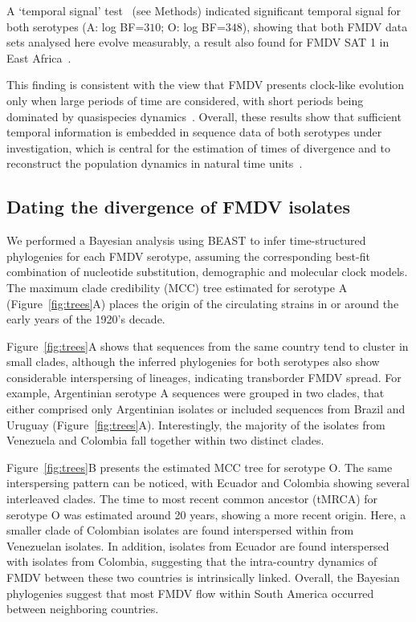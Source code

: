 \documentclass[10pt]{article}
\begin{document}
A  `temporal signal' test~\cite{Faria2012} (see Methods) indicated significant temporal signal for both serotypes (A: log BF=$310$; O: log BF=$348$), showing that both FMDV data sets analysed here evolve measurably, a result also found for FMDV SAT 1 in East Africa~\cite{sangula}.

This finding is consistent with the view that FMDV presents clock-like evolution only when large periods of time are considered, with short periods being dominated by quasispecies dynamics~\cite{Muellner2011}.
Overall, these results show that sufficient temporal information is embedded in sequence data of both serotypes under investigation, which is central for the estimation of times of divergence and to reconstruct the population dynamics in natural time units~\cite{MEP}.

\subsection*{Dating the divergence of FMDV isolates}

We performed a Bayesian analysis using BEAST to infer time-structured phylogenies for each FMDV serotype, assuming the corresponding best-fit combination of nucleotide substitution, demographic and molecular clock models.
The maximum clade credibility (MCC) tree estimated for serotype A (Figure~\ref{fig:trees}A) places the origin of the circulating strains in or around the early years of the 1920's decade.

Figure~\ref{fig:trees}A shows that sequences from the same country tend to cluster in small clades, although the inferred phylogenies for both serotypes also show considerable interspersing of lineages, indicating transborder FMDV spread.
For example, Argentinian serotype A sequences were grouped in two clades, that either comprised only Argentinian isolates or included sequences from Brazil and Uruguay (Figure~\ref{fig:trees}A).
Interestingly, the majority of the isolates from Venezuela and Colombia fall together within two distinct clades. 

Figure~\ref{fig:trees}B presents the estimated MCC tree for serotype O.
The same interspersing pattern can be noticed, with Ecuador and Colombia showing several interleaved clades.
The time to most recent common ancestor (tMRCA) for serotype O was estimated around 20 years, showing a more recent origin.
Here, a smaller clade of Colombian isolates are found interspersed within from Venezuelan isolates.
In addition, isolates from Ecuador are found interspersed with isolates from Colombia, suggesting that the intra-country dynamics of FMDV between these two countries is intrinsically linked.
Overall, the Bayesian phylogenies suggest that most FMDV flow within South America occurred between neighboring countries. 
\end{document}
